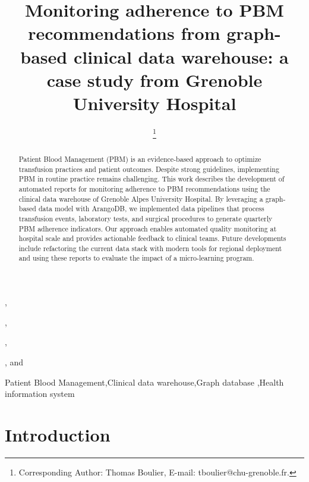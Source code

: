 \documentclass{IOS-Book-Article}
\def\hb{\hbox to 11.5 cm{}}
\begin{document}
\pagestyle{headings}
\def\thepage{}
\begin{frontmatter}

\title{Monitoring adherence to PBM recommendations from graph-based clinical data warehouse: a case study from Grenoble University Hospital}

\markboth{}{October 2025\hb}

\author[A]{ },
\author[A]{ },
\author[A]{ },
\author[A]{ %
\thanks{Corresponding Author: Thomas Boulier, E-mail: tboulier@chu-grenoble.fr.}}, 
and
\author[A]{ }

\address[A]{Univ. Grenoble Alpes, CNRS, UMR 5525, VetAgro Sup, Grenoble INP, CHU Grenoble Alpes, TIMC, 38000 Grenoble, France}

\begin{abstract}
Patient Blood Management (PBM) is an evidence-based approach to optimize transfusion 
practices and patient outcomes. Despite strong guidelines, implementing PBM in routine 
practice remains challenging. This work describes the development of 
automated reports for monitoring adherence to PBM recommendations using the 
clinical data warehouse of Grenoble Alpes University Hospital. 
By leveraging a graph-based data model with ArangoDB, we implemented data pipelines
that process transfusion events, laboratory tests, and surgical procedures to generate 
quarterly PBM adherence indicators. Our approach enables automated quality monitoring 
at hospital scale and provides actionable feedback to clinical teams. Future 
developments include refactoring the current data stack with modern tools for regional
deployment and using these reports to evaluate the impact of a micro-learning program.
\end{abstract}

\begin{keyword}
Patient Blood Management\sep Clinical data warehouse\sep Graph database \sep Health information system
\end{keyword}
\end{frontmatter}

\markboth{October 2025\hb}{October 2025\hb}

\section{Introduction}
\end{document}
